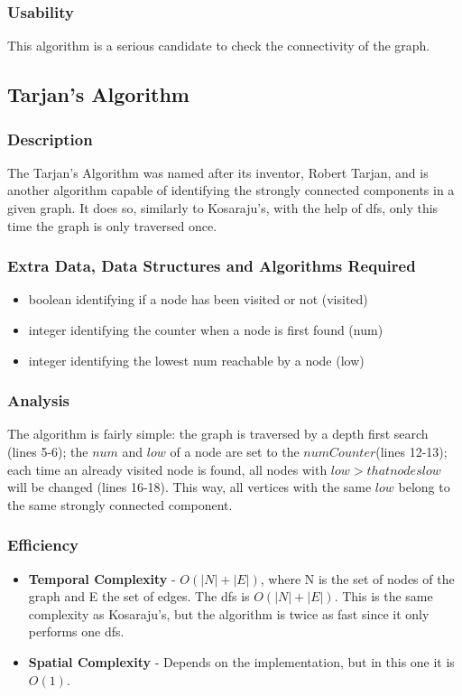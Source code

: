 \subsubsection{Usability}
This algorithm is a serious candidate to check the connectivity of the graph.


\subsection{Tarjan's Algorithm}

\subsubsection{Description}
The Tarjan's Algorithm was named after its inventor, Robert Tarjan, and is another algorithm capable of identifying the strongly connected components in a given graph. It does so, similarly to Kosaraju's, with the help of dfs, only this time the graph is only traversed once.

\subsubsection{Extra Data, Data Structures and Algorithms Required}
\begin{itemize}
    \item boolean identifying if a node has been visited or not (visited)
    \item integer identifying the counter when a node is first found (num)
    \item integer identifying the lowest num reachable by a node (low)
\end{itemize}



\subsubsection{Analysis}
The algorithm is fairly simple: the graph is traversed by a depth first search (lines 5-6); the $num$ and $low$ of a node are set to the $numCounter$(lines 12-13); each time an already visited node is found, all nodes with $low > that nodes low$ will be changed (lines 16-18). This way, all vertices with the same $low$ belong to the same strongly connected component. 

\subsubsection{Efficiency}
\begin{itemize}
    \item \textbf{Temporal Complexity} - $ O(|N|+|E|) $, where N is the set of nodes of the graph and E the set of edges. The dfs is $O(|N|+|E|)$. This is the same complexity as Kosaraju's, but the algorithm is twice as fast since it only performs one dfs.
    \item \textbf{Spatial Complexity} - Depends on the implementation, but in this one it is $ O(1) $.
\end{itemize}

